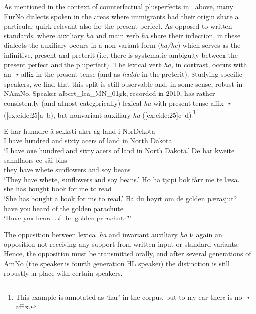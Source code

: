\documentclass[output=paper]{langscibook}
\begin{document}
As mentioned in the context of counterfactual plusperfects in . above, many EurNo dialects spoken in the areas where immigrants had their origin share a particular quirk relevant also for the present perfect. As opposed to written standards, where auxiliary \textit{ha} and main verb \textit{ha} share their inflection, in these dialects the auxiliary occurs in a non-variant form (\textit{ha/he}) which serves as the infinitive, present and preterit (i.e. there is systematic ambiguity between the present perfect and the pluperfect). The lexical verb \textit{ha,} in contrast, occurs with an -\textit{r} affix in the present tense (and as \textit{hadde} in the preterit). Studying specific speakers, we find that this split is still observable and, in some sense, robust in NAmNo. Speaker albert\_lea\_MN\_01gk, recorded in 2010, has rather consistently (and almost categorically) lexical \textit{ha} with present tense affix -\textit{r} (\ref{ex:eide:25}a--b), but nonvariant auxiliary \textit{ha} (\ref{ex:eide:25}c--d).\footnote{This example is annotated as ‘har’ in the corpus, but to my ear there is no \textit{-r} affix.} 

\ea%
    \label{ex:eide:25}
    \ea  
    \gll   E har hunndre å sekksti aker åg land i NorDekota\\
           I have hundred and sixty acers of land in {North Dakota}      \\
    \glt  ‘I have one hundred and sixty acers of land in North Dakota.’ 
    \ex  
    \gll  De har kvæite sannflaors ee såi bins\\
          they have whete sunflowers and soy beans\\
    \glt ‘They have whete, sunflowers and soy beans.’
    \ex  
    \gll  Ho ha tjøpi bok fårr me te læsa. \\
          she has bought book for me to read\\
    \glt  ‘She has bought a book for me to read.’
    \ex 
    \gll  Ha du høyrt om de golden pærasjut?\\
          have you heard of the golden parachute\\
    \glt  ‘Have you heard of the golden parachute?’
    \z %
\z

The opposition between lexical \textit{ha} and invariant auxiliary \textit{ha} is again an opposition not receiving any support from written input or standard variants. Hence, the opposition must be transmitted orally, and after several generations of AmNo (the speaker is fourth generation HL speaker) the distinction is still robustly in place with certain speakers. 
\end{document}

